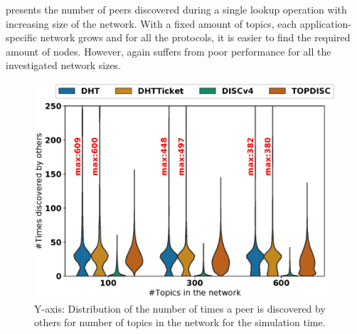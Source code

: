  presents the number of peers discovered during a single lookup operation with increasing size of the network. With a fixed amount of topics, each application-specific network grows and for all the protocols, it is easier to find the required amount of nodes.
 However, \discv again suffers from poor performance for all the investigated network sizes. 

\iffalse %
\begin{figure}
\includegraphics[width=\linewidth]{results/no_split/violin_topic_wasDiscovered.eps}
\caption{Y-axis: Distribution of the number of times a peer is discovered by others for number of topics in the network for the simulation time.}
\label{fig:discoveredByPerTopic}
\end{figure}

